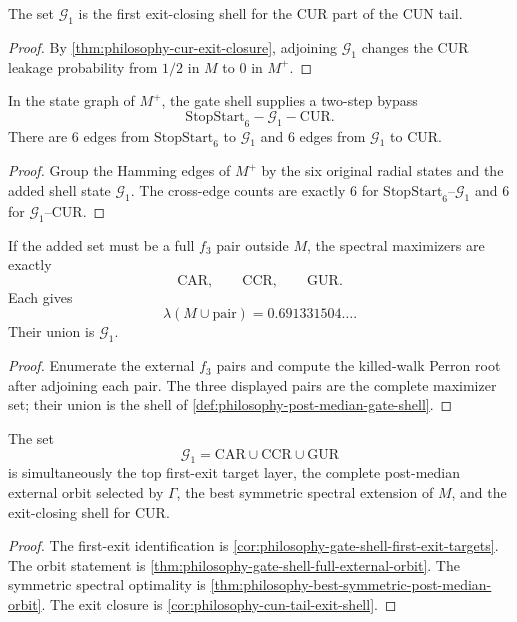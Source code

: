 \begin{corollary}
\label{cor:philosophy-cun-tail-exit-shell}
The set $\mathcal G_{1}$ is the first exit-closing shell for the
$\mathrm{CUR}$ part of the CUN tail.
\end{corollary}
\begin{proof}
By \autoref{thm:philosophy-cur-exit-closure}, adjoining
$\mathcal G_{1}$ changes the $\mathrm{CUR}$ leakage probability from
$1/2$ in $M$ to $0$ in $M^{+}$.
\end{proof}

\begin{theorem}
\label{thm:philosophy-gate-shell-bypass}
In the state graph of $M^{+}$, the gate shell supplies a two-step bypass
$$
  \mathrm{StopStart}_{6}
  -
  \mathcal G_{1}
  -
  \mathrm{CUR}.
$$
There are $6$ edges from $\mathrm{StopStart}_{6}$ to $\mathcal G_{1}$
and $6$ edges from $\mathcal G_{1}$ to $\mathrm{CUR}$.
\end{theorem}
\begin{proof}
Group the Hamming edges of $M^{+}$ by the six original radial states
and the added shell state $\mathcal G_{1}$. The cross-edge counts are
exactly $6$ for
$\mathrm{StopStart}_{6}$--$\mathcal G_{1}$ and $6$ for
$\mathcal G_{1}$--$\mathrm{CUR}$.
\end{proof}

\begin{theorem}
\label{thm:philosophy-best-wobble-pair-expansion}
If the added set must be a full $f_{3}$ pair outside $M$, the spectral
maximizers are exactly
$$
  \mathrm{CAR},\qquad
  \mathrm{CCR},\qquad
  \mathrm{GUR}.
$$
Each gives
$$
  \lambda(M\cup \text{pair})=0.691331504\ldots.
$$
Their union is $\mathcal G_{1}$.
\end{theorem}
\begin{proof}
Enumerate the external $f_{3}$ pairs and compute the killed-walk Perron
root after adjoining each pair. The three displayed pairs are the
complete maximizer set; their union is the shell of
\autoref{def:philosophy-post-median-gate-shell}.
\end{proof}

\begin{theorem}
\label{thm:philosophy-post-median-gate-shell}
The set
$$
  \mathcal G_{1}
  =
  \mathrm{CAR}\cup\mathrm{CCR}\cup\mathrm{GUR}
$$
is simultaneously the top first-exit target layer, the complete
post-median external orbit selected by $\Gamma$, the best symmetric
spectral extension of $M$, and the exit-closing shell for
$\mathrm{CUR}$.
\end{theorem}
\begin{proof}
The first-exit identification is
\autoref{cor:philosophy-gate-shell-first-exit-targets}. The orbit
statement is \autoref{thm:philosophy-gate-shell-full-external-orbit}.
The symmetric spectral optimality is
\autoref{thm:philosophy-best-symmetric-post-median-orbit}. The exit
closure is \autoref{cor:philosophy-cun-tail-exit-shell}.
\end{proof}

